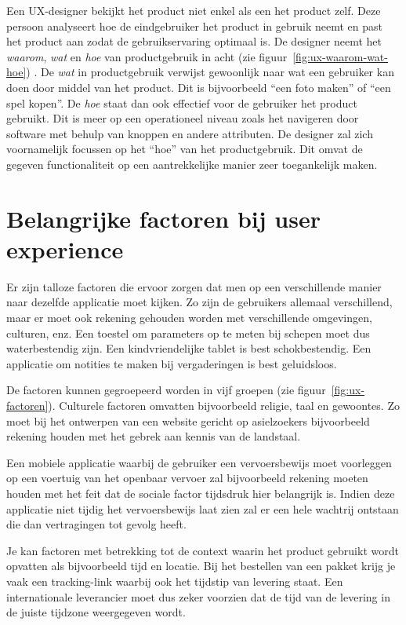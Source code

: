 Een UX-designer bekijkt het product niet enkel als een het product zelf. Deze persoon analyseert hoe de eindgebruiker het product in gebruik neemt en past het product aan zodat de gebruikservaring optimaal is. De designer neemt het \textit{waarom}, \textit{wat} en \textit{hoe} van productgebruik in acht (zie figuur~\ref{fig:ux-waarom-wat-hoe}) \autocite{Hassenzahl2013}. De \textit{wat} in productgebruik verwijst gewoonlijk naar wat een gebruiker kan doen door middel van het product. Dit is bijvoorbeeld ``een foto maken'' of ``een spel kopen''. De \textit{hoe} staat dan ook effectief voor de gebruiker het product gebruikt. Dit is meer op een operationeel niveau zoals het navigeren door software met behulp van knoppen en andere attributen. De designer zal zich voornamelijk focussen op het ``hoe'' van het productgebruik. Dit omvat de gegeven functionaliteit op een aantrekkelijke manier zeer toegankelijk maken.

\section{Belangrijke factoren bij user experience}
\label{sec:belangrijke-factoren-bij-user-experience}

Er zijn talloze factoren die ervoor zorgen dat men op een verschillende manier naar dezelfde applicatie moet kijken. Zo zijn de gebruikers allemaal verschillend, maar er moet ook rekening gehouden worden met verschillende omgevingen, culturen, enz. Een toestel om parameters op te meten bij schepen moet dus waterbestendig zijn. Een kindvriendelijke tablet is best schokbestendig. Een applicatie om notities te maken bij vergaderingen is best geluidsloos.

De factoren kunnen gegroepeerd worden in vijf groepen (zie figuur~\ref{fig:ux-factoren}). Culturele factoren omvatten bijvoorbeeld religie, taal en gewoontes. Zo moet bij het ontwerpen van een website gericht op asielzoekers bijvoorbeeld rekening houden met het gebrek aan kennis van de landstaal.

Een mobiele applicatie waarbij de gebruiker een vervoersbewijs moet voorleggen op een voertuig van het openbaar vervoer zal bijvoorbeeld rekening moeten houden met het feit dat de sociale factor tijdsdruk hier belangrijk is. Indien deze applicatie niet tijdig het vervoersbewijs laat zien zal er een hele wachtrij ontstaan die dan vertragingen tot gevolg heeft.

Je kan factoren met betrekking tot de context waarin het product gebruikt wordt opvatten als bijvoorbeeld tijd en locatie. Bij het bestellen van een pakket krijg je vaak een tracking-link waarbij ook het tijdstip van levering staat. Een internationale leverancier moet dus zeker voorzien dat de tijd van de levering in de juiste tijdzone weergegeven wordt.

